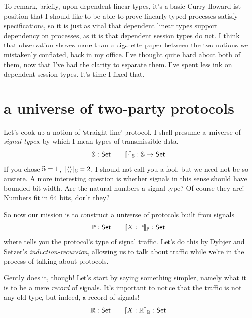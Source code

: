 \documentclass{book}
\newcommand{\D}[1]{\blue{\ensuremath{\mathsf{#1}}}}
\newcommand{\C}[1]{\red{\ensuremath{\mathsf{#1}}}}
\newcommand{\N}[1]{\black{\ensuremath{#1}}}
\newcommand{\SET}{\D{\mathsf{Set}}}
\newcommand{\vd}{\C{\langle\rangle}}
\begin{document}
To remark, briefly, upon dependent linear types, it's a basic Curry-Howard-ist position that I should like to be able to prove linearly typed processes satisfy specifications, so it is just as vital that dependent linear types support dependency on processes, as it is that dependent session types do not. I think that observation shoves more than a cigarette paper between the two notions we mistakenly conflated, back in my office. I've thought quite hard about both of them, now that I've had the clarity to separate them. I've spent less ink on dependent session types. It's time I fixed that.


\section{a universe of two-party protocols}

\newcommand{\Signal}{\D{\mathbb{S}}}
\newcommand{\signal}[1]{\green{\ensuremath{\llbracket \N{#1} \rrbracket_{\Signal}}}}
\newcommand{\Protocol}{\D{\mathbb{P}}}
\newcommand{\protocol}[1]{\green{\ensuremath{\llbracket \N{#1} \rrbracket_{\Protocol}}}}
\newcommand{\Record}{\D{\mathbb{R}}}
\newcommand{\record}[1]{\green{\ensuremath{\llbracket \N{#1} \rrbracket_{\Record}}}}
\newcommand{\send}[1]{\C{!}#1}
\newcommand{\op}[1]{#1^{\C{\bot}}}
\newcommand{\Sg}[2]{\C{\Upsigma}\:#1\:#2}

Let's cook up a notion of `straight-line' protocol. I shall presume a universe of \emph{signal types}, by which I mean types of transmissible data.
\[
\Signal : \SET \qquad \signal{\cdot} : \Signal\to\SET
\]
If you chose $\Signal = 1$, $\signal\vd = 2$, I should not call you a fool, but we need not be so austere. A more interesting question is whether signals in this sense should have bounded bit width. Are the natural numbers a signal type? Of course they are! Numbers fit in 64 bits, don't they?

So now our mission is to construct a universe of protocols built from signals
\[
\Protocol : \SET \qquad \protocol{X : \Protocol} : \SET
\]
where %
tells you the protocol's type of signal traffic. Let's do this by Dybjer and Setzer's \emph{induction-recursion}, allowing us to talk about traffic while we're in the process of talking about protocols.

Gently does it, though! Let's start by saying something simpler,
namely what it is to be a mere \emph{record} of signals. It's
important to notice that the traffic is not any old type, but
indeed, a record of signals!
\[
\Record : \SET \qquad \record{X : \Record} : \SET
\]
\end{document}
